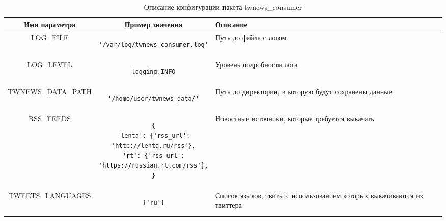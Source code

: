         \begin{table}[h!]
            \small
            \caption{Описание конфигурации пакета twnews\_consumer \bigskip}
            \center

            \label{tabular:consumer_config}
            \begin{tabular}{|c|c|m{5cm}|}
                \hline
                \bf{Имя параметра} & \bf{Пример значения} & \bf{Описание} \\ \hline

                LOG\_FILE & \begin{lstlisting}[basicstyle=\small]
'/var/log/twnews_consumer.log'
                \end{lstlisting} & Путь до файла с логом \\ \hline

                LOG\_LEVEL & \begin{lstlisting}[basicstyle=\small]
logging.INFO
                \end{lstlisting} & Уровень подробности лога \\ \hline

                TWNEWS\_DATA\_PATH & \begin{lstlisting}[basicstyle=\small]
'/home/user/twnews_data/'
                \end{lstlisting} & Путь до директории, в которую будут сохранены данные \\ \hline

                RSS\_FEEDS &
                \begin{lstlisting}[basicstyle=\small]
{
'lenta': {'rss_url':
'http://lenta.ru/rss'},
'rt': {'rss_url':
'https://russian.rt.com/rss'},
}
                \end{lstlisting} & Новостные источники, которые требуется выкачать \\ \hline

                TWEETS\_LANGUAGES & \begin{lstlisting}[basicstyle=\small]
['ru']
                \end{lstlisting} & Список языков, твиты с использованием которых выкачиваются из твиттера \\ \hline
            \end{tabular}
        \end{table}

